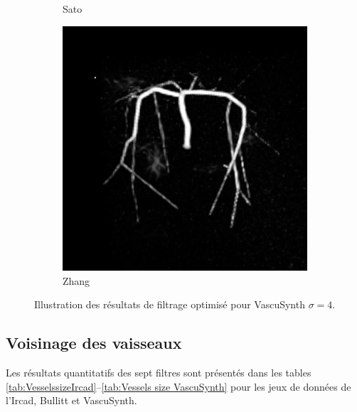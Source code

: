 \begin{figure}[!ht]
\begin{subfigure}[t]{0.32\textwidth}
    \caption{Sato}
  \end{subfigure}
  \begin{subfigure}[t]{0.32\textwidth}
    \includegraphics[clip = true, trim = 80 80 80 80,width=\textwidth]{Images/Vascu_4_Zhang.png}
    \caption{Zhang}
  \end{subfigure}
  \centering
  \caption{Illustration des résultats de filtrage optimisé pour VascuSynth $\sigma=4$.}
  \label{fig:qualitative results VascuSynth}
\end{figure}

\subsection{Voisinage des vaisseaux}
Les résultats quantitatifs des sept filtres sont présentés dans les tables \ref{tab:VesselssizeIrcad}--\ref{tab:Vessels size VascuSynth} pour les jeux de données de l'Ircad, Bullitt et VascuSynth.
